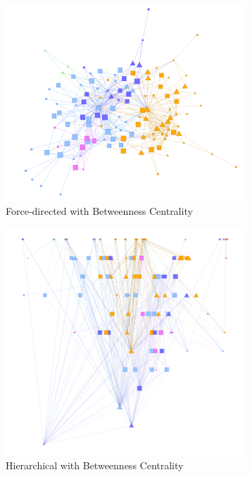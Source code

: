 \begin{figure}[p]
\centering
\includegraphics[width=0.8\textwidth]{img/regexp/direct.png}
\caption{Force-directed with Betweenness Centrality}\label{fig:regexp:direct}
\end{figure}

\begin{figure}[p]
\centering
\includegraphics[width=0.8\textwidth]{img/regexp/hierarchical.png}
\caption{Hierarchical with Betweenness Centrality}\label{fig:regexp:hier}
\end{figure}

